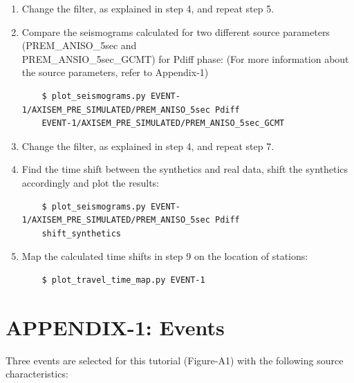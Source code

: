 \documentclass{article}
\begin{document}
\begin{enumerate}
    \item Change the filter, as explained in step 4, and repeat step 5.
    
    \item Compare the seismograms calculated for two different source parameters
    (PREM\_ANISO\_5sec and \\ PREM\_ANSIO\_5sec\_GCMT) for Pdiff phase: (For more
    information about the source parameters, refer to Appendix-1)
    
    \begin{verbatim}
    $ plot_seismograms.py EVENT-1/AXISEM_PRE_SIMULATED/PREM_ANISO_5sec Pdiff 
    EVENT-1/AXISEM_PRE_SIMULATED/PREM_ANISO_5sec_GCMT
    \end{verbatim}
    
    \item Change the filter, as explained in step 4, and repeat step 7.
    
    \item Find the time shift between the synthetics and real data, shift the synthetics
    accordingly and plot the results:
    
    \begin{verbatim}
    $ plot_seismograms.py EVENT-1/AXISEM_PRE_SIMULATED/PREM_ANISO_5sec Pdiff 
    shift_synthetics
    \end{verbatim}
    
    \item Map the calculated time shifts in step 9 on the location of stations:
    
    \begin{verbatim}
    $ plot_travel_time_map.py EVENT-1
    \end{verbatim}

\end{enumerate}

\newpage
\appendix
\section{APPENDIX-1: Events}

Three events are selected for this tutorial (Figure-A1) with the following source 
characteristics:
\end{document}
